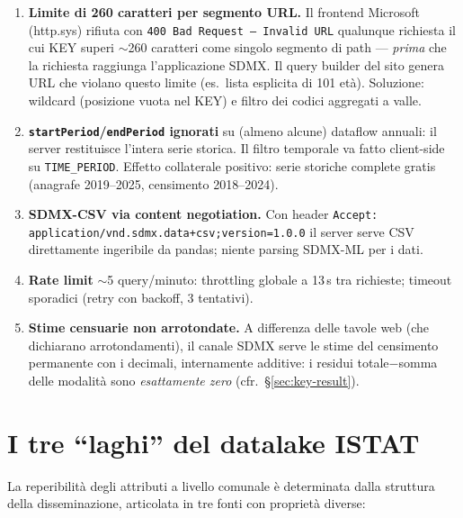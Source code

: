 \documentclass[11pt,a4paper]{article}
\newcommand{\code}[1]{\texttt{#1}}
\begin{document}
\begin{enumerate}[leftmargin=*]
  \item \textbf{Limite di 260 caratteri per segmento URL.} Il frontend Microsoft
  (http.sys) rifiuta con \code{400 Bad Request -- Invalid URL} qualunque richiesta
  il cui KEY superi $\sim$260 caratteri come singolo segmento di path ---
  \emph{prima} che la richiesta raggiunga l'applicazione SDMX. Il query builder
  del sito genera URL che violano questo limite (es.\ lista esplicita di 101
  et\`a). Soluzione: wildcard (posizione vuota nel KEY) e filtro dei codici
  aggregati a valle.
  \item \textbf{\code{startPeriod}/\code{endPeriod} ignorati} su (almeno alcune)
  dataflow annuali: il server restituisce l'intera serie storica. Il filtro
  temporale va fatto client-side su \code{TIME\_PERIOD}. Effetto collaterale
  positivo: serie storiche complete gratis (anagrafe 2019--2025, censimento
  2018--2024).
  \item \textbf{SDMX-CSV via content negotiation.} Con header
  \code{Accept: application/vnd.sdmx.data+csv;version=1.0.0} il server serve CSV
  direttamente ingeribile da pandas; niente parsing SDMX-ML per i dati.
  \item \textbf{Rate limit} $\sim$5 query/minuto: throttling globale a 13\,s tra
  richieste; timeout sporadici (retry con backoff, 3 tentativi).
  \item \textbf{Stime censuarie non arrotondate.} A differenza delle tavole web
  (che dichiarano arrotondamenti), il canale SDMX serve le stime del censimento
  permanente con i decimali, internamente additive: i residui
  totale$-$somma delle modalit\`a sono \emph{esattamente zero}
  (cfr.~\S\ref{sec:key-result}).
\end{enumerate}

\section{I tre ``laghi'' del datalake ISTAT}
\label{sec:laghi}
La reperibilit\`a degli attributi a livello comunale \`e determinata dalla
struttura della disseminazione, articolata in tre fonti con propriet\`a diverse:
\end{document}
